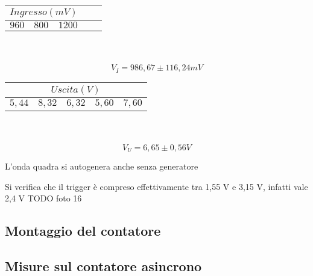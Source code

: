 \documentclass[a4paper]{article}
\begin{document}
\begin{center}
  \begin{tabular}{|r|l|l|l|l|}
     \hline
     \multicolumn{3}{|c|}{\(Ingresso (mV)\)} \\
     \hline
     \(960\) & \(800\) & \(1200\) \\
     \hline
   \end{tabular} \\ \\
\[V_I=986,67 \pm 116,24 mV\]


 \begin{tabular}{|r|l|l|l|l|}
     \hline
     \multicolumn{5}{|c|}{\(Uscita (V)\)} \\
     \hline
     \(5,44\) & \(8,32\) & \(6,32\) & \(5,60\) & \(7,60\) \\
     \hline
   \end{tabular} \\ \\

\[V_U=6,65 \pm 0,56 V\]
\end{center}
 L'onda quadra si autogenera anche senza generatore

Si verifica che il trigger è compreso effettivamente tra 1,55 V e 3,15 V, infatti vale 2,4 V  TODO foto 16 

\begin{tcolorbox}[breakable,colback=cyan,colframe=cyan]
\section*{Montaggio del contatore}
\end{tcolorbox}


\begin{tcolorbox}[breakable,colback=cyan,colframe=cyan]
\section*{Misure sul contatore asincrono}
\end{tcolorbox}
\end{document}
